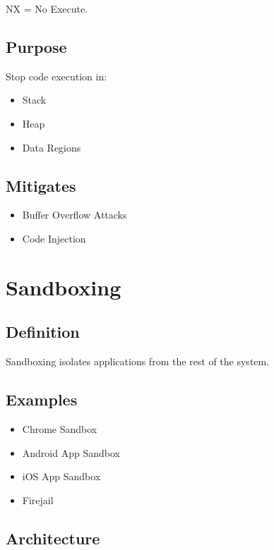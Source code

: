NX = No Execute.

\subsection{Purpose}

Stop code execution in:

\begin{itemize}
\item Stack
\item Heap
\item Data Regions
\end{itemize}

\subsection{Mitigates}

\begin{itemize}
\item Buffer Overflow Attacks
\item Code Injection
\end{itemize}

\section{Sandboxing}

\subsection{Definition}

Sandboxing isolates applications from the rest of the system.

\subsection{Examples}

\begin{itemize}
\item Chrome Sandbox
\item Android App Sandbox
\item iOS App Sandbox
\item Firejail
\end{itemize}

\subsection{Architecture}

